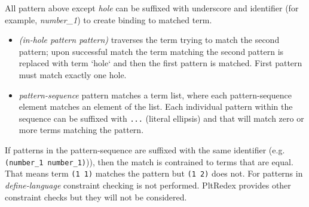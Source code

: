 All pattern above except \textit{hole} can be suffixed with underscore and identifier (for example, \textit{number\_1}) to create binding to matched term.

\begin{itemize}
\item
\textit{(in-hole pattern pattern)} traverses the term trying to match the second pattern; upon successful match the term matching the second pattern is replaced with term `hole` and then the first pattern is matched. First pattern must match exactly one hole.

\item

\textit{pattern-sequence} pattern matches a term list, where each pattern-sequence element matches an element of the list. Each individual pattern within the sequence can be suffixed with \texttt{...} (literal ellipsis) and that will match zero or more terms matching the pattern.
\end{itemize}

If patterns in the pattern-sequence are suffixed with the same identifier (e.g. \texttt{(number\_1 number\_1)})), then the match is contrained to terms that are equal. That means term \texttt{(1 1)} matches the pattern but \texttt{(1 2)} does not. For patterns in \textit{define-language} constraint checking is not performed. PltRedex provides other constraint checks but they will not be considered.
